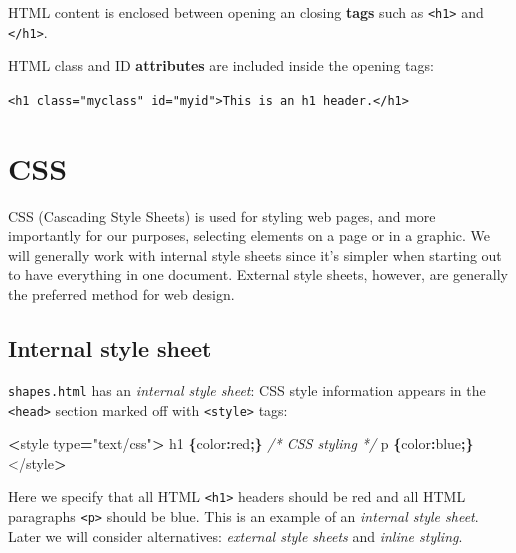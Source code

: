 \documentclass[openany]{book}
\newenvironment{Shaded}{\begin{snugshade}}{\end{snugshade}}
\newcommand{\CommentTok}[1]{\textcolor[rgb]{0.56,0.35,0.01}{\textit{#1}}}
\newcommand{\DataTypeTok}[1]{\textcolor[rgb]{0.13,0.29,0.53}{#1}}
\newcommand{\NormalTok}[1]{#1}
\newcommand{\OperatorTok}[1]{\textcolor[rgb]{0.81,0.36,0.00}{\textbf{#1}}}
\newcommand{\StringTok}[1]{\textcolor[rgb]{0.31,0.60,0.02}{#1}}
\begin{document}
HTML content is enclosed between opening an closing \textbf{tags} such as \texttt{\textless{}h1\textgreater{}} and \texttt{\textless{}/h1\textgreater{}}.

HTML class and ID \textbf{attributes} are included inside the opening tags:

\texttt{\textless{}h1\ class="myclass"\ id="myid"\textgreater{}This\ is\ an\ h1\ header.\textless{}/h1\textgreater{}}

\hypertarget{css}{%
\section{CSS }\label{css}}

CSS (Cascading Style Sheets) is used for styling web pages, and more importantly for our purposes, selecting elements on a page or in a graphic. We will generally work with internal style sheets since it's simpler when starting out to have everything in one document. External style sheets, however, are generally the preferred method for web design.

\hypertarget{internal-style-sheet}{%
\subsection{Internal style sheet}\label{internal-style-sheet}}

\texttt{shapes.html} has an \emph{internal style sheet}: CSS style information appears in the \texttt{\textless{}head\textgreater{}} section marked off with \texttt{\textless{}style\textgreater{}} tags:

\begin{Shaded}
\begin{Highlighting}[]
\OperatorTok{<}\NormalTok{style type}\OperatorTok{=}\StringTok{"text/css"}\OperatorTok{>}
\NormalTok{    h1 }\OperatorTok{\{}\DataTypeTok{color}\OperatorTok{:}\NormalTok{red}\OperatorTok{;\}}     \CommentTok{/* CSS styling */}
\NormalTok{    p }\OperatorTok{\{}\DataTypeTok{color}\OperatorTok{:}\NormalTok{blue}\OperatorTok{;\}}
\NormalTok{</style}\OperatorTok{>}
\end{Highlighting}
\end{Shaded}

Here we specify that all HTML \texttt{\textless{}h1\textgreater{}} headers should be red and all HTML paragraphs \texttt{\textless{}p\textgreater{}} should be blue. This is an example of an \emph{internal style sheet}. Later we will consider alternatives: \emph{external style sheets} and \emph{inline styling}.
\end{document}
